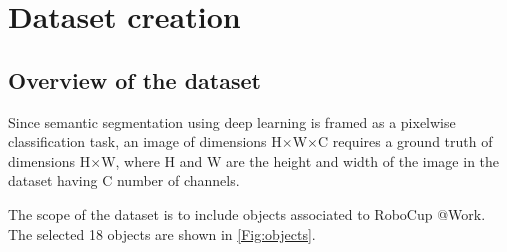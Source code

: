 
\chapter{Dataset creation}

\section{Overview of the dataset}
Since semantic segmentation using deep learning is framed as a pixelwise classification task, an image of dimensions H$\times$W$\times$C requires a ground truth of dimensions H$\times$W, where H and W are the height and width of the image in the dataset having C number of channels. 

The scope of the dataset is to include objects associated to RoboCup @Work. The selected 18 objects are shown in \ref{Fig:objects}.

